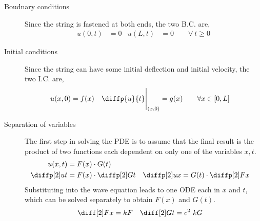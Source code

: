 \begin{description}
    \item[Boudnary conditions] Since the string is fastened at both ends, the two B.C.
        are,
        \begin{align}
            u(0, t) & = 0 & u(L, t) & = 0 \qquad \forall \ t \geq 0
        \end{align}

    \item[Initial conditions] Since the string can have some initial deflection and
        initial velocity, the two I.C. are,
        \begin{align}
            u(x, 0)                      & = f(x)                           &
            \diffp {u}{t}\Bigg|_{(x, 0)} & = g(x) \qquad \forall x \in[0,L]
        \end{align}

    \item[Separation of variables] The first step in solving the PDE is to assume that
        the final result is the product of two functions each dependent on only one of
        the variables $ x, t $.
        \begin{align}
            u(x, t)      & = F(x) \cdot G(t)           \\
            \diffp[2] ut & = F(x) \cdot \diffp[2] Gt &
            \diffp[2] ux & = G(t) \cdot \diffp[2] Fx
        \end{align}
        Substituting into the wave equation leads to one ODE each in $ x $ and $ t $,
        which can be solved separately to obtain $ F(x) $ and $ G(t) $.
        \begin{align}
            \diff[2] Fx & = kF      &
            \diff[2] Gt & = c^2\ kG
        \end{align}


\end{description}
